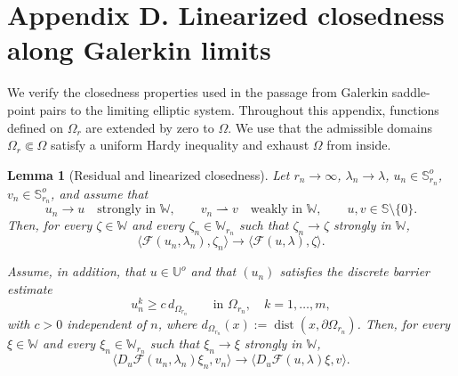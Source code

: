 \documentclass[preprint,10pt]{elsarticle}
\numberwithin{equation}{section}
\newtheorem{lem}[thm]{Lemma}
\begin{document}
\section{Appendix D. Linearized closedness along Galerkin limits}
\label{sec:appendix-CD}

We verify the closedness properties used in the passage from Galerkin
saddle-point pairs to the limiting elliptic system. Throughout this appendix,
functions defined on \(\Omega_r\) are extended by zero to \(\Omega\). We use
that the admissible domains \(\Omega_r\Subset\Omega\) satisfy a uniform Hardy
inequality and exhaust \(\Omega\) from inside.

\begin{lem}[Residual and linearized closedness]
	\label{lem:CD-elliptic}
	Let \(r_n\to\infty\), \(\lambda_n\to\lambda\),
	\(u_n\in\mathbb S_{r_n}^o\), \(v_n\in\mathbb S_{r_n}^o\), and assume that
	\[
	u_n\to u \quad\text{strongly in }\mathbb W,
	\qquad
	v_n\rightharpoonup v \quad\text{weakly in }\mathbb W,
	\qquad
	u,v\in\mathbb S\setminus\{0\}.
	\]
	Then, for every \(\zeta\in\mathbb W\) and every
	\(\zeta_n\in\mathbb W_{r_n}\) such that
	\(\zeta_n\to\zeta\) strongly in \(\mathbb W\),
	\[
	\langle\mathcal F(u_n,\lambda_n),\zeta_n\rangle
	\to
	\langle\mathcal F(u,\lambda),\zeta\rangle .
	\]
	
	Assume, in addition, that \(u\in\mathbb U^o\) and that \((u_n)\) satisfies
	the discrete barrier estimate
	\[
	u_n^k\ge c\,d_{\Omega_{r_n}}
	\qquad\text{in }\Omega_{r_n},\quad k=1,\ldots,m,
	\]
	with \(c>0\) independent of \(n\), where
	\(d_{\Omega_{r_n}}(x):=\operatorname{dist}(x,\partial\Omega_{r_n})\).
	Then, for every \(\xi\in\mathbb W\) and every
	\(\xi_n\in\mathbb W_{r_n}\) such that
	\(\xi_n\to\xi\) strongly in \(\mathbb W\),
	\[
	\bigl\langle
	D_u\mathcal F(u_n,\lambda_n)\xi_n,v_n
	\bigr\rangle
	\to
	\bigl\langle
	D_u\mathcal F(u,\lambda)\xi,v
	\bigr\rangle .
	\]
\end{lem}
\end{document}
